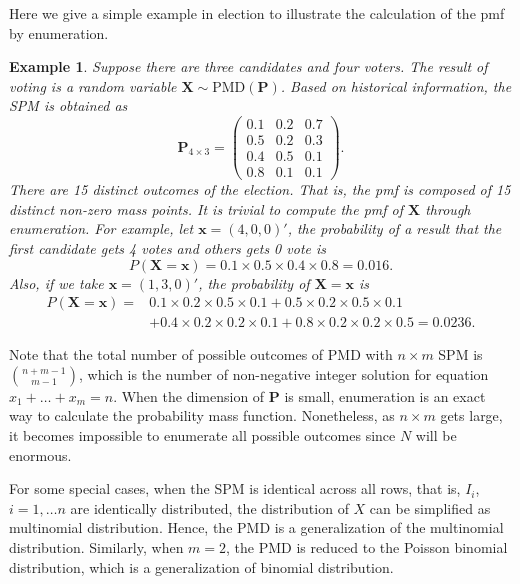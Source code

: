 \documentclass[12pt]{article}
\newcommand{\Pmat}{\mathbf{P}}
\newcommand{\PMD}{\textrm{PMD}}
\newcommand{\Xvec}{\boldsymbol{X}}
\newcommand{\xvec}{\boldsymbol{x}}
\newcommand{\qedw}{\hfill \ensuremath{\Box}}
\newtheorem{example}{Example}
\begin{document}
Here we give a simple example in election to illustrate the calculation of the pmf by enumeration.
\begin{example}%
Suppose there are three candidates and four voters. The result of voting is a random variable $\Xvec \sim \PMD(\Pmat)$. Based on historical information, the SPM is obtained as
\begin{equation*}
\Pmat_{4 \times 3} = \begin{pmatrix}
0.1 &  0.2 & 0.7\\
0.5 & 0.2 & 0.3\\
0.4 &  0.5 & 0.1\\
0.8 & 0.1 & 0.1
\end{pmatrix}.
\end{equation*}
There are 15 distinct outcomes of the election. That is, the pmf is composed of 15 distinct non-zero mass points. It is trivial to compute the pmf of $\Xvec$ through enumeration. For example, let $\xvec =  (4,0,0)'$, the probability of a result that the first candidate gets 4 votes and others gets 0 vote is
\begin{equation*}
P\left( \Xvec = \xvec \right) = 0.1\times 0.5 \times 0.4 \times 0.8 = 0.016.
\end{equation*}
Also, if we take $\xvec=(1,3,0)'$, the probability of $\Xvec = \xvec$ is
\begin{align*}
P\left( \Xvec = \xvec \right)  =  & 0.1\times 0.2 \times 0.5 \times 0.1 +
 0.5\times0.2\times0.5 \times 0.1 \\
 & + 0.4\times0.2\times0.2\times0.1 + 0.8\times0.2\times0.2\times0.5 = 0.0236.
\end{align*}
\end{example}

Note that the total number of possible outcomes of $\PMD$ with $n \times m$ SPM is $\binom{n+m-1}{m-1}$, which is the number of non-negative integer solution for equation $x_1 + \dots + x_m = n$. When the dimension of $\Pmat$ is small, enumeration is an exact way to calculate the probability mass function. Nonetheless, as $n \times m$ gets large, it becomes impossible to enumerate all possible outcomes since $N$ will be enormous.

For some special cases, when the SPM is identical across all rows, that is, $I_{i}$, $i = 1, \dots n$ are identically distributed, the distribution of $X$ can be simplified as multinomial distribution. Hence, the $\PMD$ is a generalization of the multinomial distribution. Similarly, when $m=2$, the $\PMD$ is reduced to the Poisson binomial distribution, which is a generalization of binomial distribution.
\end{document}
